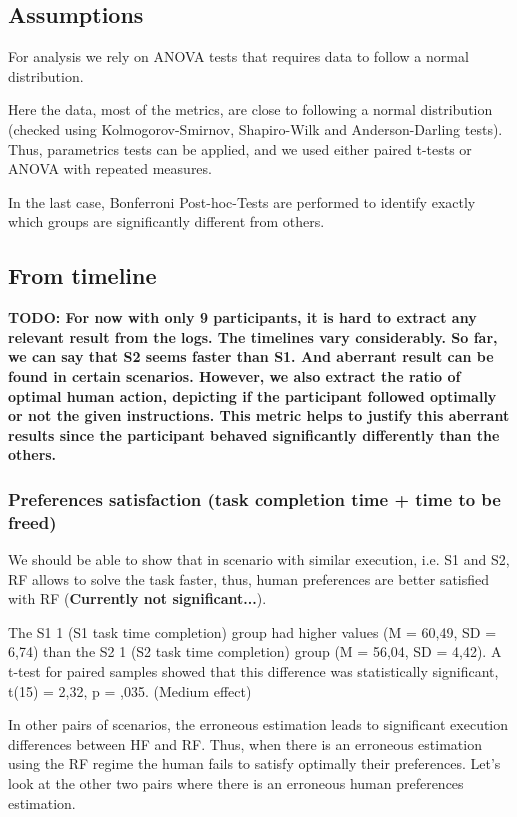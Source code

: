 \subsection{Assumptions}

For analysis we rely on ANOVA tests that requires data to follow a normal distribution. 

Here the data, most of the metrics, are close to following a normal distribution (checked using Kolmogorov-Smirnov, Shapiro-Wilk and Anderson-Darling tests). Thus, parametrics tests can be applied, and we used either paired t-tests or ANOVA with repeated measures.

In the last case, Bonferroni Post-hoc-Tests are performed to identify exactly which groups are significantly different from others.



\subsection{From timeline}
\textbf{TODO: For now with only 9 participants, it is hard to extract any relevant result from the logs. The timelines vary considerably. So far, we can say that S2 seems faster than S1. And aberrant result can be found in certain scenarios. However, we also extract the ratio of optimal human action, depicting if the participant followed optimally or not the given instructions. This metric helps to justify this aberrant results since the participant behaved significantly differently than the others.}

\subsubsection*{Preferences satisfaction (task completion time + time to be freed)}
We should be able to show that in scenario with similar execution, i.e. S1 and S2, RF allows to solve the task faster, thus, human preferences are better satisfied with RF (\textbf{Currently not significant...}).

The S1 1 (S1 task time completion) group had higher values (M = 60,49, SD = 6,74) than the S2 1 (S2 task time completion) group (M = 56,04, SD = 4,42). A t-test for paired samples showed that this difference was statistically significant, t(15) = 2,32, p = ,035. (Medium effect)

In other pairs of scenarios, the erroneous estimation leads to significant execution differences between HF and RF. Thus, when there is an erroneous estimation using the RF regime the human fails to satisfy optimally their preferences. Let's look at the other two pairs where there is an erroneous human preferences estimation. 

